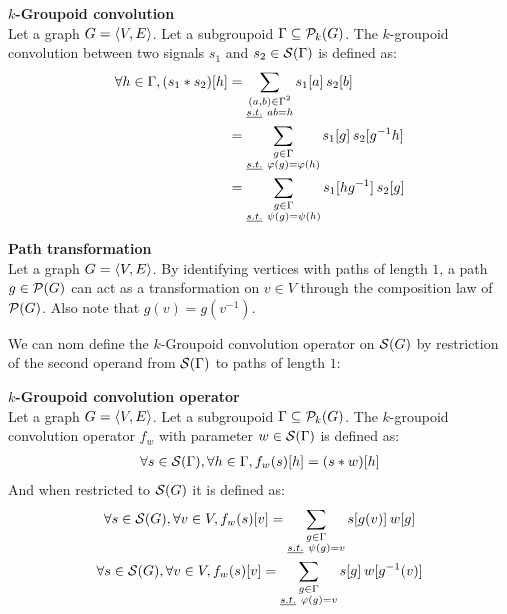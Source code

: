\begin{definition}\textbf{$k$-Groupoid convolution}\\
Let a graph $\gve$. Let a subgroupoid $\Gamma \subseteq \cp_k(G)$. The $k$-groupoid convolution between two signals $s_1$ and $s_2 \in \cs(\Gamma)$ is defined as:
\begin{align*}
\forall h \in \Gamma, (s_1 \ast s_2) [h] & = \displaystyle \sum_{\substack{(a,b) \in \Gamma^2 \\ \st ab=h }} s_1[a] \h{2} s_2[b] \\
& = \displaystyle \sum_{\substack{g \in \Gamma\\ \st \varphi(g) = \varphi(h)}} s_1[g] \h{2} s_2[g^{-1}h]\\
& = \displaystyle \sum_{\substack{g \in \Gamma\\ \st \psi(g) = \psi(h)}} s_1[hg^{-1}] \h{2} s_2[g]
\end{align*}
\label{def:pconv}
\end{definition}

\begin{claim}\textbf{Path transformation}\\
Let a graph $\gve$. By identifying vertices with paths of length $1$, a path $g \in \cp(G)$ can act as a transformation on $v \in V$ through the composition law of $\cp(G)$. Also note that $g(v) = g(v^{-1})$.
\end{claim}

We can nom define the $k$-Groupoid convolution operator on $\cs(G)$ by restriction of the second operand from $\cs(\Gamma)$ to paths of length $1$:

\begin{definition}\textbf{$k$-Groupoid convolution operator}\\
Let a graph $\gve$. Let a subgroupoid $\Gamma \subseteq \cp_k(G)$. The $k$-groupoid convolution operator $f_w$ with parameter $w \in \cs(\Gamma)$ is defined as:
\begin{gather*}
\forall s \in \cs(\Gamma), \forall h \in \Gamma, f_w(s)[h] = (s \ast w)[h]
\end{gather*}
And when restricted to $\cs(G)$ it is defined as:
\begin{gather*}
\forall s \in \cs(G), \forall v \in V, f_w(s)[v] = \displaystyle \sum_{\substack{g \in \Gamma\\ \st \psi(g) = v}} s[g(v)] \h{2} w[g]\\
\forall s \in \cs(G), \forall v \in V, f_w(s)[v] = \displaystyle \sum_{\substack{g \in \Gamma\\ \st \varphi(g) = v}} s[g] \h{2} w[g^{-1}(v)]
\end{gather*}
\end{definition}

